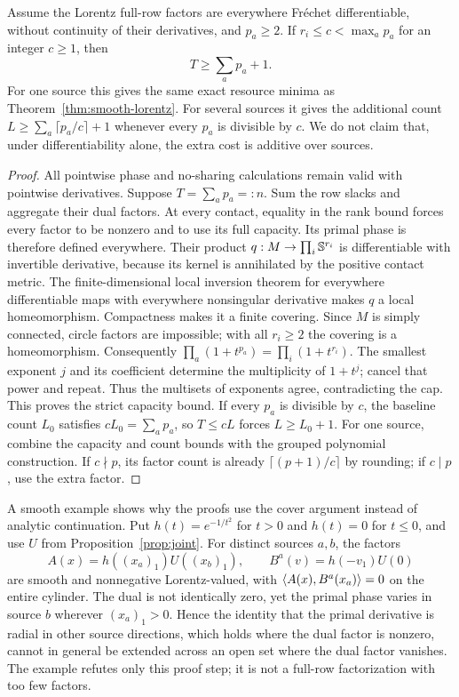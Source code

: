 \begin{proposition}\label{prop:differentiable}
Assume the Lorentz full-row factors are everywhere Fr\'echet
differentiable, without continuity of their derivatives, and $p_a\geq2$.
If $r_i\leq c<\max_ap_a$ for an integer $c\geq1$, then
\[
 T\geq\sum_ap_a+1.
\]
For one source this gives the same exact resource minima as
Theorem~\ref{thm:smooth-lorentz}. For several sources it gives the
additional count $L\geq\sum_a\lceil p_a/c\rceil+1$ whenever every
$p_a$ is divisible by $c$. We do not claim that, under differentiability
alone, the extra cost is additive over sources.
\end{proposition}
\begin{proof}
All pointwise phase and no-sharing calculations remain valid with
pointwise derivatives. Suppose $T=\sum_ap_a=:n$. Sum the row slacks
and aggregate their dual factors. At every contact, equality in the
rank bound forces every factor to be nonzero and to use its full
capacity. Its primal phase is therefore defined everywhere. Their
product $q:M\to\prod_i\mathbb S^{r_i}$ is differentiable with invertible
derivative, because its kernel is annihilated by the positive contact
metric. The finite-dimensional local inversion theorem for everywhere
differentiable maps with everywhere nonsingular derivative
\cite{SaintRaymond2002} makes $q$ a local homeomorphism. Compactness
makes it a finite covering. Since $M$ is simply connected, circle
factors are impossible; with all $r_i\geq2$ the covering is a
homeomorphism. Consequently
$\prod_a(1+t^{p_a})=\prod_i(1+t^{r_i})$.
The smallest exponent $j$ and its coefficient determine the
multiplicity of $1+t^j$; cancel that power and repeat. Thus the multisets of exponents
agree, contradicting the cap. This proves the strict capacity bound.
If every $p_a$ is divisible by $c$, the baseline count $L_0$ satisfies
$cL_0=\sum_ap_a$, so $T\leq cL$ forces $L\geq L_0+1$.
For one source, combine the capacity and count bounds with the grouped
polynomial construction. If $c\nmid p$, its factor count is already
$\lceil(p+1)/c\rceil$ by rounding; if $c\mid p$, use the extra factor.
\end{proof}

A smooth example shows why the proofs use the cover argument instead of
analytic continuation. Put $h(t)=e^{-1/t^2}$ for $t>0$ and $h(t)=0$ for
$t\leq0$, and use $U$ from Proposition~\ref{prop:joint}. For distinct
sources $a,b$, the factors
\[
 A(x)=h((x_a)_1)U((x_b)_1),\qquad
 B^a(v)=h(-v_1)U(0)
\]
are smooth and nonnegative Lorentz-valued, with
$\langle A(x),B^a(x_a)\rangle=0$ on the entire cylinder. The dual is not
identically zero, yet the primal phase varies in source $b$ wherever
$(x_a)_1>0$. Hence the identity that the primal derivative is radial
in other source directions, which holds where the dual factor is nonzero, cannot in general be extended across an open
set where the dual factor vanishes. The example refutes only this proof
step; it is not a full-row factorization with too few factors.

